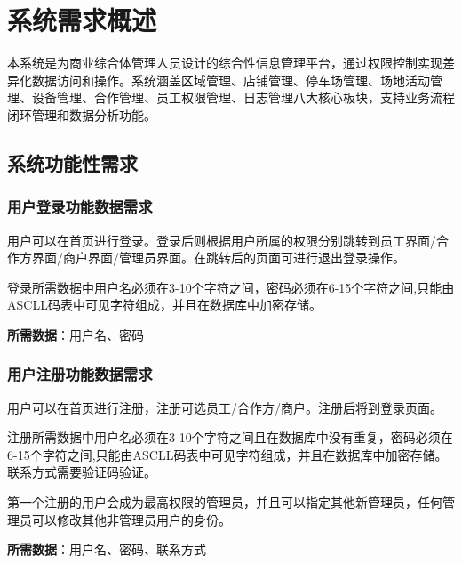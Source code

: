 \documentclass[]{article}
\begin{document}
\hypertarget{ux7cfbux7edfux9700ux6c42ux6982ux8ff0}{%
\section{系统需求概述}\label{ux7cfbux7edfux9700ux6c42ux6982ux8ff0}}

本系统是为商业综合体管理人员设计的综合性信息管理平台，通过权限控制实现差异化数据访问和操作。系统涵盖区域管理、店铺管理、停车场管理、场地活动管理、设备管理、合作管理、员工权限管理、日志管理八大核心板块，支持业务流程闭环管理和数据分析功能。

\hypertarget{ux7cfbux7edfux529fux80fdux6027ux9700ux6c42}{%
\subsection{系统功能性需求}\label{ux7cfbux7edfux529fux80fdux6027ux9700ux6c42}}

\hypertarget{ux7528ux6237ux767bux5f55ux529fux80fdux6570ux636eux9700ux6c42}{%
\subsubsection{用户登录功能数据需求}\label{ux7528ux6237ux767bux5f55ux529fux80fdux6570ux636eux9700ux6c42}}

用户可以在首页进行登录。登录后则根据用户所属的权限分别跳转到员工界面/合作方界面/商户界面/管理员界面。在跳转后的页面可进行退出登录操作。

登录所需数据中用户名必须在3-10个字符之间，密码必须在6-15个字符之间,只能由ASCLL码表中可见字符组成，并且在数据库中加密存储。

\textbf{所需数据}：用户名、密码

\hypertarget{ux7528ux6237ux6ce8ux518cux529fux80fdux6570ux636eux9700ux6c42}{%
\subsubsection{用户注册功能数据需求}\label{ux7528ux6237ux6ce8ux518cux529fux80fdux6570ux636eux9700ux6c42}}

用户可以在首页进行注册，注册可选员工/合作方/商户。注册后将到登录页面。

注册所需数据中用户名必须在3-10个字符之间且在数据库中没有重复，密码必须在6-15个字符之间,只能由ASCLL码表中可见字符组成，并且在数据库中加密存储。联系方式需要验证码验证。

第一个注册的用户会成为最高权限的管理员，并且可以指定其他新管理员，任何管理员可以修改其他非管理员用户的身份。

\textbf{所需数据}：用户名、密码、联系方式
\end{document}

